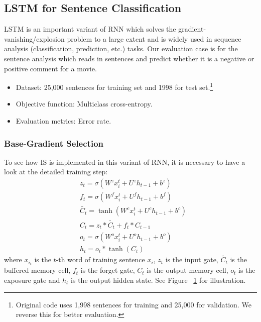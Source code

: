 \documentclass[twoside,leqno,twocolumn]{article}
\begin{document}
\begin{figure}[t]
	\label{lstm-fig}
\end{figure}
\subsection{LSTM for Sentence Classification}
LSTM \cite{gers1999learning, graves2012supervised, hochreiter1997long} is an important variant of RNN which solves the gradient-vanishing/explosion problem to a large extent and is widely used in sequence analysis (classification, prediction, etc.) tasks. Our evaluation case is for the sentence analysis which reads in sentences and predict whether it is a negative or positive comment for a movie.
\begin{itemize}
\item Dataset: 25,000 sentences for training set and 1998 for test set.\footnote{Original code uses 1,998 sentences for training and 25,000 for validation. We reverse this for better evaluation.}
\item Objective function: Multiclass cross-entropy.
\item Evaluation metrics: Error rate.
\end{itemize}
\subsubsection{Base-Gradient Selection}
To see how IS is implemented in this variant of RNN, it is necessary to have a look at the detailed training step:
\begin{equation}
\begin{aligned}
&z_t=\sigma(W^zx_{i}^t+U^zh_{t-1}+b^z)\\
&f_t=\sigma(W^fx_{i}^t+U^fh_{t-1}+b^f)\\
&\tilde{C_t}=\tanh(W^cx_{i}^t+U^ch_{t-1}+b^c)\\
&C_t=z_t\ast\tilde{C_t}+f_t\ast C_{t-1}\\
&o_t=\sigma(W^ox_{i}^t+U^oh_{t-1}+b^o)\\
&h_t=o_t\ast\tanh(C_t)
\end{aligned}
\end{equation}
where $x_{i_t}$ is the $t$-th word of training sentence $x_i$, $z_t$ is the input gate, $\tilde{C_t}$ is the buffered memory cell, $f_t$ is the forget gate, $C_t$ is the output memory cell, $o_t$ is the exposure gate and $h_t$ is the output hidden state. See Figure ~\ref{lstm-fig} for illustration.
\end{document}

